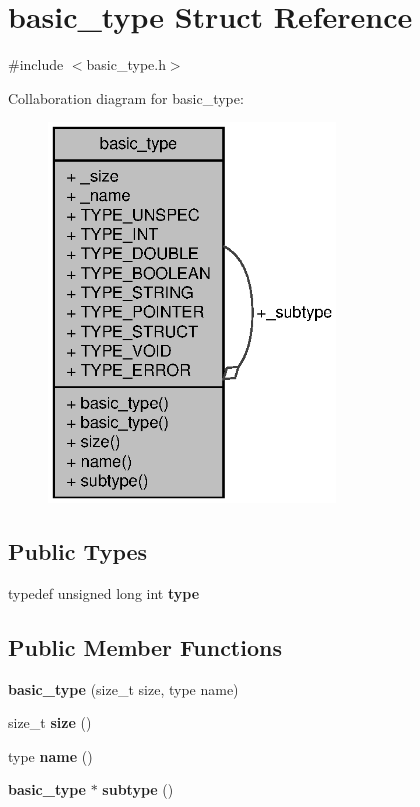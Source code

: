 \section{basic\+\_\+type Struct Reference}
\label{structbasic__type}


{\ttfamily \#include $<$basic\+\_\+type.\+h$>$}



Collaboration diagram for basic\+\_\+type\+:
\nopagebreak
\begin{figure}[H]
\begin{center}
\leavevmode
\includegraphics[width=216pt]{structbasic__type__coll__graph}
\end{center}
\end{figure}
\subsection*{Public Types}
\begin{DoxyCompactItemize}
\item 
\mbox{\label{structbasic__type_a7c0a7a590da8a3705a88d5e207e4b9ad}} 
typedef unsigned long int {\bfseries type}
\end{DoxyCompactItemize}
\subsection*{Public Member Functions}
\begin{DoxyCompactItemize}
\item 
\mbox{\label{structbasic__type_a700988000343593c00601ec255b04d0b}} 
{\bfseries basic\+\_\+type} (size\+\_\+t size, type name)
\item 
\mbox{\label{structbasic__type_a4f76b416ac41dde6d7a9f51d7e909891}} 
size\+\_\+t {\bfseries size} ()
\item 
\mbox{\label{structbasic__type_aaf747bec5153a84f07097482a77eae29}} 
type {\bfseries name} ()
\item 
\mbox{\label{structbasic__type_ac3c708c8bbd2274461227daee6b50a6a}} 
\textbf{ basic\+\_\+type} $\ast$ {\bfseries subtype} ()
\end{DoxyCompactItemize}
